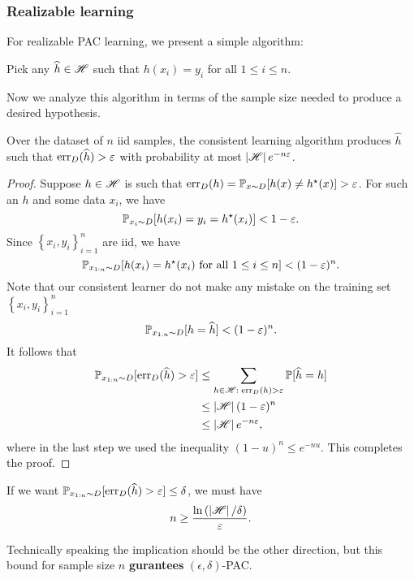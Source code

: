 \documentclass[a4paper]{article}
\begin{document}
\subsubsection*{Realizable learning}

For realizable PAC learning, we present a simple algorithm:
\begin{algorithm}
Pick any $\widehat{h} \in \mathscr{H}$ such that $h(x_i) = y_i$ 
for all $1 \leq i \leq n$.
\end{algorithm}
Now we analyze this algorithm in terms of the sample size needed 
to produce a desired hypothesis.

\begin{thm}
  Over the dataset of $n$ iid samples,
  the consistent learning algorithm produces $\hat{h}$ such 
  that $\operatorname{err}_D(\widehat{h}) > \varepsilon$ with probability
  at most $\left\lvert \mathscr{H}\right\rvert e^{-n\varepsilon}$. 
\end{thm}
\begin{proof}
  Suppose $h \in \mathscr{H}$ is such that 
  $\operatorname{err}_D(h) = \mathbb{P}_{x \sim D} [h(x) \neq h^\star(x)] > \varepsilon$.
  For such an $h$ and some data $x_i$, we have 
  \[
  \mathbb{P}_{x_i \sim D} [h(x_i) = y_i = h^\star(x_i)] < 1 - \varepsilon.
  \]
  Since $\left\{ x_i, y_i \right\}_{i=1}^n$ are iid, we have 
  \[
  \mathbb{P}_{x_{1:n} \sim D}[h(x_i) = h^\star(x_i) \text{ for all 
  $1 \leq i \leq n$}] < (1 - \varepsilon)^n.
  \]
  Note that our consistent learner do not make any mistake 
  on the training set $\left\{ x_i, y_i \right\}_{i=1}^n$
  \[
  \mathbb{P}_{x_{1 : n} \sim D} [h = \widehat{h}] < (1 - \varepsilon)^n.
  \]
  It follows that 
  \[
  \begin{aligned}
    \mathbb{P}_{x_{1 : n} \sim D} [\operatorname{err}_D (\widehat{h}) > \varepsilon] 
    & \leq \sum_{h \in \mathscr{H}: \; \operatorname{err}_D(h) > \varepsilon} 
    \mathbb{P}[\widehat{h} = h]  \\
    & \leq \left\lvert \mathscr{H}\right\rvert (1 - \varepsilon)^n \\
    & \leq \left\lvert \mathscr{H}\right\rvert e^{-n\varepsilon},
  \end{aligned}
  \]
  where in the last step we used the inequality 
  $(1 - u)^n \leq e^{-nu}$. This completes the proof.
\end{proof}

\begin{cor}
  If we want $\mathbb{P}_{x_{1 : n} \sim D} [\operatorname{err}_D (\widehat{h}) > \varepsilon]
  \leq \delta$, we must have 
  \[
  n \geq \frac{\ln \left( \left\lvert \mathscr{H}\right\rvert / \delta \right)}{\varepsilon}.
  \]
\end{cor}
Technically speaking the implication should be the other direction, 
but this bound for sample size $n$ 
\textbf{gurantees} $(\epsilon, \delta)$-PAC.
\end{document}
